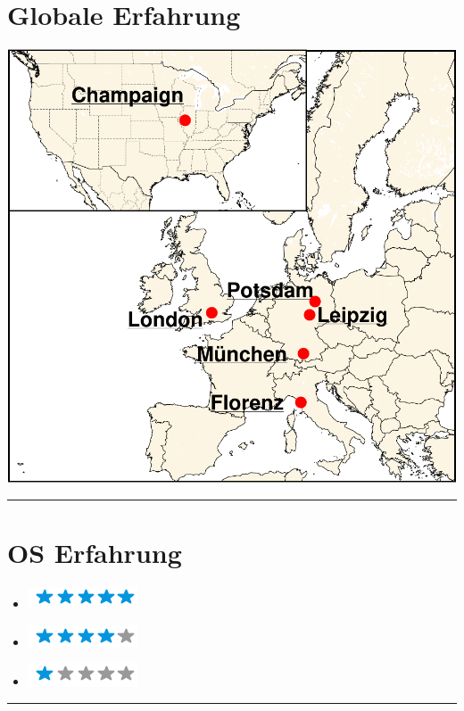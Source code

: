 \documentclass{article}
\begin{document}
\begin{minipage}[t]{0.3\textwidth}
	\centering
	\section*{\hfill \fontsize{18pt}{24pt}\selectfont \color{pblue} Globale Erfahrung \hfill}
	\vspace{-2mm}
	\includegraphics[scale=0.3]{../img/globalEXP.pdf}
	\vspace{2mm}
	\hrule
	\vspace{-3mm}
	\section*{\fontsize{18pt}{24pt}\selectfont \color{pblue} OS Erfahrung}
	\vspace{-2mm}
	\begin{itemize}
	\centering
	\item[\textbf{\LARGE \faLinux}]\includegraphics[scale=0.50]{../img/5stars.png}\vspace{-2mm}
	\item[\textbf{\LARGE \faWindows}]\includegraphics[scale=0.50]{../img/4stars.png}\vspace{-2mm}
    \item[\textbf{\LARGE \faApple}]\includegraphics[scale=0.50]{../img/1stars.png}
    \end{itemize}
	\hrule
	\vspace{-2mm}

\end{minipage}
\end{document}
